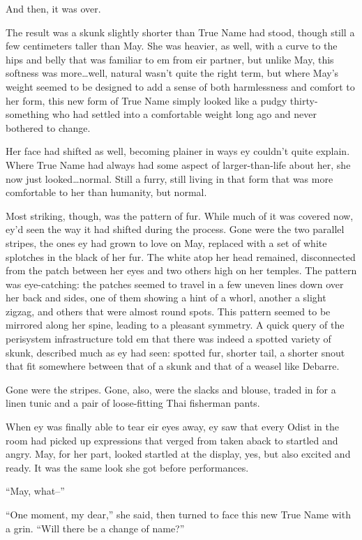 And then, it was over.

The result was a skunk slightly shorter than True Name had stood, though still a few centimeters taller than May. She was heavier, as well, with a curve to the hips and belly that was familiar to em from eir partner, but unlike May, this softness was more\ldots well, natural wasn't quite the right term, but where May's weight seemed to be designed to add a sense of both harmlessness and comfort to her form, this new form of True Name simply looked like a pudgy thirty-something who had settled into a comfortable weight long ago and never bothered to change.

Her face had shifted as well, becoming plainer in ways ey couldn't quite explain. Where True Name had always had some aspect of larger-than-life about her, she now just looked\ldots normal. Still a furry, still living in that form that was more comfortable to her than humanity, but normal.

Most striking, though, was the pattern of fur. While much of it was covered now, ey'd seen the way it had shifted during the process. Gone were the two parallel stripes, the ones ey had grown to love on May, replaced with a set of white splotches in the black of her fur. The white atop her head remained, disconnected from the patch between her eyes and two others high on her temples. The pattern was eye-catching: the patches seemed to travel in a few uneven lines down over her back and sides, one of them showing a hint of a whorl, another a slight zigzag, and others that were almost round spots. This pattern seemed to be mirrored along her spine, leading to a pleasant symmetry. A quick query of the perisystem infrastructure told em that there was indeed a spotted variety of skunk, described much as ey had seen: spotted fur, shorter tail, a shorter snout that fit somewhere between that of a skunk and that of a weasel like Debarre.

Gone were the stripes. Gone, also, were the slacks and blouse, traded in for a linen tunic and a pair of loose-fitting Thai fisherman pants.

When ey was finally able to tear eir eyes away, ey saw that every Odist in the room had picked up expressions that verged from taken aback to startled and angry. May, for her part, looked startled at the display, yes, but also excited and ready. It was the same look she got before performances.

``May, what--''

``One moment, my dear,'' she said, then turned to face this new True Name with a grin. ``Will there be a change of name?''

